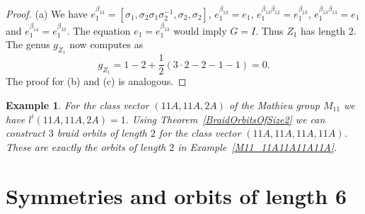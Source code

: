 \documentclass[12pt,a4paper]{article}
\newtheorem{example}{Example}[section]
\numberwithin{equation}{section}
\numberwithin{table}{section}
\begin{document}
\begin{proof}
(a) We have $e_1^{\beta_{13}}=[\sigma_1,\sigma_2 \sigma_1 \sigma^{-1}_2,\sigma_2,\sigma_2]$,
$e_1^{\beta_{12}}=e_1$, $e_1^{\beta_{13}\beta_{12}}=e_1^{\beta_{13}}$, $e_1^{\beta_{13}\beta_{13}}=e_1$
and $e_1^{\beta_{14}}=e_1^{\beta_{13}}$.
The equation $e_1=e_1^{\beta_{13}}$ would imply $G=I$. Thus $Z_1$ has length 2.
The genus $g_{Z_1}$ now computes as 
$$g_{Z_1}=1 - 2 + \frac{1}{2}(3\cdot 2 - 2 -1 -1) = 0.$$
The proof for (b) and (c) is analogous.
\end{proof}
%
\begin{example}
\label{M11_11A11A2A}
For the class vector $(11A,11A,2A)$ of the Mathieu group $M_{11}$ we have $l^i(11A,11A,2A)=1$.
Using Theorem~\ref{BraidOrbitsOfSize2} we can construct $3$ braid orbits of length $2$ for the
class vector $(11A,11A,11A,11A)$. These are exactly the orbits of length $2$
in Example~\ref{M11_11A11A11A11A}.
\end{example}

\section{Symmetries and orbits of length 6}\label{SectionSymmetriesAndOrbitsOfSize6}
\end{document}
